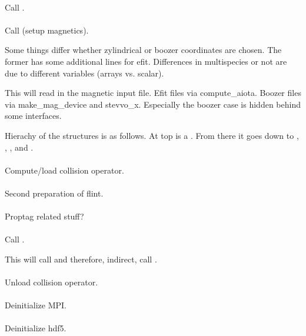 \paragraph{}
Call .

\paragraph{}
Call  (setup magnetics).

Some things differ whether zylindrical or boozer coordinates are chosen.
The former has some additional lines for efit.
Differences in multispecies or not are due to different variables
(arrays vs. scalar).

This will read in the magnetic input file.
Efit files via compute\_aiota.
Boozer files via make\_mag\_device and stevvo\_x. Especially the boozer
case is hidden behind some interfaces.

Hierachy of the structures is as follows. At top is a .
From there it goes down to , ,
,  and
.

\paragraph{}
Compute/load collision operator.

\paragraph{}
Second preparation of flint.

\paragraph{}
Proptag related stuff?

\paragraph{}
Call .

This will call  and therefore,
indirect, call .

\paragraph{}
Unload collision operator.

\paragraph{}
Deinitialize MPI.

\paragraph{}
Deinitialize hdf5.
